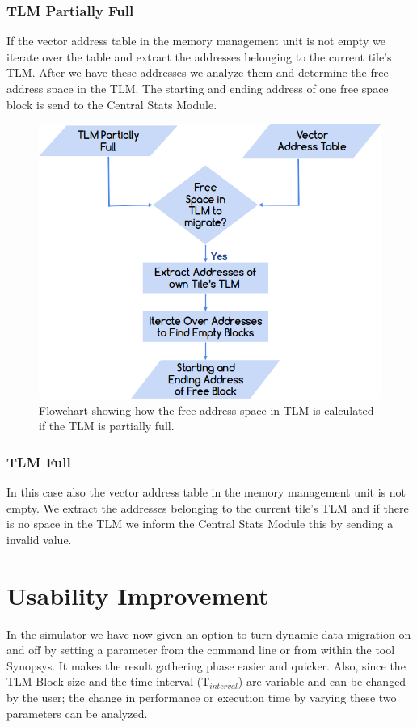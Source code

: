 \documentclass{listhesis}
\begin{document}
\subsubsection{TLM Partially Full}
If the vector address table in the memory management unit is not empty we iterate over the table and extract the addresses belonging to the current tile's TLM. After we have these addresses we analyze them and determine the free address space in the TLM. The starting and ending address of one free space block is send to the Central Stats Module.\\
\begin{figure}
  \includegraphics[width=0.7\linewidth]{tlmpartiallyempty.png}
  \centering
  \caption{Flowchart showing how the free address space in TLM is calculated if the TLM is partially full.}
  \label{fig:freeSpaceTLM}
\end{figure}
\subsubsection{TLM Full}
In this case also the vector address table in the memory management unit is not empty. We extract the addresses belonging to the current tile's TLM and if there is no space in the TLM we inform the Central Stats Module this by sending a invalid value.\\
\section{Usability Improvement}
In the simulator we have now given an option to turn dynamic data migration on and off by setting a parameter from the command line or from within the tool Synopsys. It makes the result gathering phase easier and quicker. Also, since the TLM Block size and the time interval (T$_{interval}$) are variable and can be changed by the user; the change in performance or execution time by varying these two parameters can be analyzed.
\end{document}
